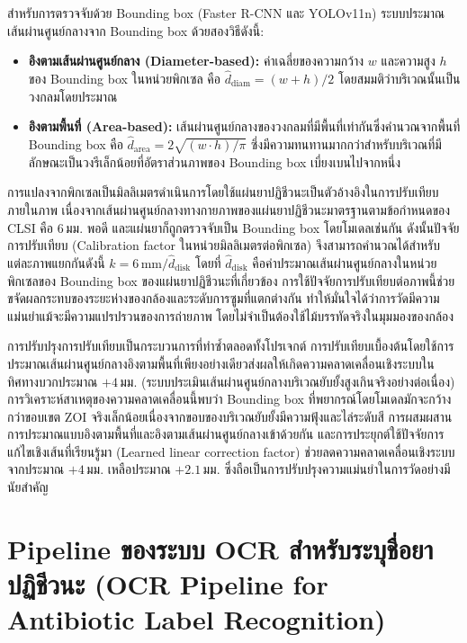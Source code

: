 สำหรับการตรวจจับด้วย Bounding box (Faster R-CNN และ YOLOv11n) ระบบประมาณเส้นผ่านศูนย์กลางจาก Bounding box ด้วยสองวิธีดังนี้:
\begin{itemize}
  \item \textbf{อิงตามเส้นผ่านศูนย์กลาง (Diameter-based):} ค่าเฉลี่ยของความกว้าง $w$ และความสูง $h$ ของ Bounding box ในหน่วยพิกเซล คือ $\hat{d}_{\mathrm{diam}} = (w + h)/2$ โดยสมมติว่าบริเวณนั้นเป็นวงกลมโดยประมาณ
  \item \textbf{อิงตามพื้นที่ (Area-based):} เส้นผ่านศูนย์กลางของวงกลมที่มีพื้นที่เท่ากันซึ่งคำนวณจากพื้นที่ Bounding box คือ $\hat{d}_{\mathrm{area}} = 2\sqrt{(w \cdot h)/\pi}$ ซึ่งมีความทนทานมากกว่าสำหรับบริเวณที่มีลักษณะเป็นวงรีเล็กน้อยที่อัตราส่วนภาพของ Bounding box เบี่ยงเบนไปจากหนึ่ง
\end{itemize}

การแปลงจากพิกเซลเป็นมิลลิเมตรดำเนินการโดยใช้แผ่นยาปฏิชีวนะเป็นตัวอ้างอิงในการปรับเทียบภายในภาพ เนื่องจากเส้นผ่านศูนย์กลางทางกายภาพของแผ่นยาปฏิชีวนะมาตรฐานตามข้อกำหนดของ CLSI คือ 6\,มม. พอดี และแผ่นยาก็ถูกตรวจจับเป็น Bounding box โดยโมเดลเช่นกัน ดังนั้นปัจจัยการปรับเทียบ (Calibration factor ในหน่วยมิลลิเมตรต่อพิกเซล) จึงสามารถคำนวณได้สำหรับแต่ละภาพแยกกันดังนี้ $k = 6\,\mathrm{mm} / \hat{d}_{\mathrm{disk}}$ โดยที่ $\hat{d}_{\mathrm{disk}}$ คือค่าประมาณเส้นผ่านศูนย์กลางในหน่วยพิกเซลของ Bounding box ของแผ่นยาปฏิชีวนะที่เกี่ยวข้อง การใช้ปัจจัยการปรับเทียบต่อภาพนี้ช่วยขจัดผลกระทบของระยะห่างของกล้องและระดับการซูมที่แตกต่างกัน ทำให้มั่นใจได้ว่าการวัดมีความแม่นยำแม้จะมีความแปรปรวนของการถ่ายภาพ โดยไม่จำเป็นต้องใช้ไม้บรรทัดจริงในมุมมองของกล้อง

การปรับปรุงการปรับเทียบเป็นกระบวนการที่ทำซ้ำตลอดทั้งโปรเจกต์ การปรับเทียบเบื้องต้นโดยใช้การประมาณเส้นผ่านศูนย์กลางอิงตามพื้นที่เพียงอย่างเดียวส่งผลให้เกิดความคลาดเคลื่อนเชิงระบบในทิศทางบวกประมาณ $+4$\,มม. (ระบบประเมินเส้นผ่านศูนย์กลางบริเวณยับยั้งสูงเกินจริงอย่างต่อเนื่อง) การวิเคราะห์สาเหตุของความคลาดเคลื่อนนี้พบว่า Bounding box ที่พยากรณ์โดยโมเดลมักจะกว้างกว่าขอบเขต ZOI จริงเล็กน้อยเนื่องจากขอบของบริเวณยับยั้งมีความฟุ้งและไล่ระดับสี การผสมผสานการประมาณแบบอิงตามพื้นที่และอิงตามเส้นผ่านศูนย์กลางเข้าด้วยกัน และการประยุกต์ใช้ปัจจัยการแก้ไขเชิงเส้นที่เรียนรู้มา (Learned linear correction factor) ช่วยลดความคลาดเคลื่อนเชิงระบบจากประมาณ $+4$\,มม. เหลือประมาณ $+2.1$\,มม. ซึ่งถือเป็นการปรับปรุงความแม่นยำในการวัดอย่างมีนัยสำคัญ

\section{Pipeline ของระบบ OCR สำหรับระบุชื่อยาปฏิชีวนะ (OCR Pipeline for Antibiotic Label Recognition)}


